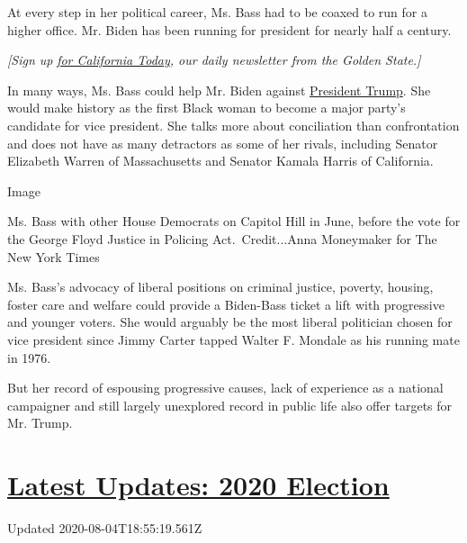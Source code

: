 At every step in her political career, Ms. Bass had to be coaxed to run
for a higher office. Mr. Biden has been running for president for nearly
half a century.

\emph{{[}Sign up}
\href{https://www.nytimes3xbfgragh.onion/newsletters/california-today}{\emph{for
California Today}}\emph{, our daily newsletter from the Golden
State.{]}}

In many ways, Ms. Bass could help Mr. Biden against
\href{https://www.nytimes3xbfgragh.onion/interactive/2020/us/elections/donald-trump.html}{President
Trump}. She would make history as the first Black woman to become a
major party's candidate for vice president. She talks more about
conciliation than confrontation and does not have as many detractors as
some of her rivals, including Senator Elizabeth Warren of Massachusetts
and Senator Kamala Harris of California.

Image

Ms. Bass with other House Democrats on Capitol Hill in June, before the
vote for the George Floyd Justice in Policing Act.~Credit...Anna
Moneymaker for The New York Times

Ms. Bass's advocacy of liberal positions on criminal justice, poverty,
housing, foster care and welfare could provide a Biden-Bass ticket a
lift with progressive and younger voters. She would arguably be the most
liberal politician chosen for vice president since Jimmy Carter tapped
Walter F. Mondale as his running mate in 1976.

But her record of espousing progressive causes, lack of experience as a
national campaigner and still largely unexplored record in public life
also offer targets for Mr. Trump.

\hypertarget{latest-updates-2020-election}{%
\section{\texorpdfstring{\href{https://www.nytimes3xbfgragh.onion/2020/08/04/us/elections/primary-election-michigan-arizona-kansas.html?action=click\&pgtype=Article\&state=default\&region=MAIN_CONTENT_1\&context=storylines_live_updates}{Latest
Updates: 2020
Election}}{Latest Updates: 2020 Election}}\label{latest-updates-2020-election}}

Updated 2020-08-04T18:55:19.561Z

